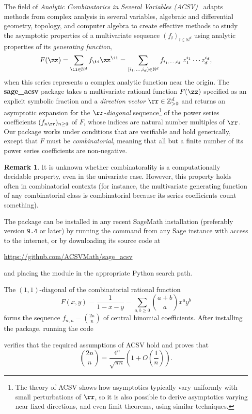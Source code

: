 \documentclass[a4paper]{amsart}
\theoremstyle{definition}
\newtheorem{remark}[theorem]{Remark}
\newenvironment{example}
  {\pushQED{\qed}\renewcommand{\qedsymbol}{$\triangleleft$}\examplex}
  {\popQED\endexamplex}
\newcommand{\Z}{{\mathbb Z}}
\newcommand{\N}{{\mathbb N}}
\newcommand{\code}[1]{\texttt{\detokenize{#1}}}
\begin{document}
The field of \emph{Analytic Combinatorics in Several Variables (ACSV)}~\cite{Melczer2021,PemantleWilson2013} adapts methods from complex analysis in several variables, algebraic and differential geometry, topology, and computer algebra to create effective methods to study the asymptotic properties of a multivariate sequence $(f_{\ii})_{\ii \in \N^d}$ using analytic properties of its \emph{generating function}, 
\[ F(\zz) = \sum_{\ii \in \N^d}f_{\ii}\zz^{\ii} = \sum_{(i_1,\ldots,i_d)\in\N^d}f_{i_1,\ldots, i_d} \; z_1^{i_1}\cdots z_d^{i_d} , \]
when this series represents a complex analytic function near the origin. 
The \textbf{sage\_acsv} package takes a multivariate rational function $F(\zz)$ specified as an explicit symbolic fraction
and a \emph{direction vector} $\rr \in \Z_{>0}^d$ and returns an asymptotic expansion for the \emph{$\rr$-diagonal} sequence\footnote{The theory of ACSV shows how asymptotics typically vary uniformly with small perturbations of $\rr$, so it is also possible to derive asymptotics varying near fixed directions, and even limit theorems, using similar techniques.} of the power series coefficients $(f_{n\rr})_{n \geq 0}$ of $F$, whose indices are natural number multiples of $\rr$. Our package works under conditions that are verifiable and hold generically, except that $F$ must be \emph{combinatorial}, meaning that all but a finite number of its power series coefficients are non-negative. 

\begin{remark}
It is unknown whether combinatorality is a computationally decidable property, even in the univariate case. However, this property holds often in combinatorial contexts (for instance, the multivariate generating function of any combinatorial class is combinatorial because its series coefficients count something).
\end{remark}

The \code{sage_acsv} package can be installed in any recent SageMath installation
(preferably version \texttt{9.4} or later) by running the command \code{sage -pip install sage-acsv}
from any Sage instance with access to the internet, or by downloading its source code at 
\begin{center}
\url{https://github.com/ACSVMath/sage_acsv} 
\end{center}
and placing the module in the appropriate Python search path.

\begin{example}
\label{ex:1}
The $(1,1)$-diagonal of the combinatorial rational function
\[F(x,y) = \frac{1}{1-x-y} = \sum_{a,b \geq 0}\binom{a+b}{a}x^ay^b\] 
forms the sequence $f_{n,n} = \binom{2n}{n}$ of central binomial coefficients. After installing the package, running the code



\noindent
verifies that the required assumptions of ACSV hold and proves that
\[ 
\binom{2n}{n} 
= \frac{4^n}{\sqrt{\pi n}}\left(1 + O\left(\frac{1}{n}\right)\right).
\]
\end{example}
\end{document}
